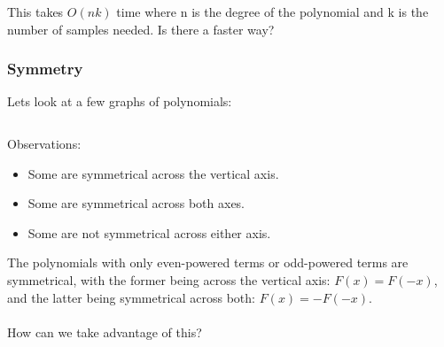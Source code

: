 \documentclass{beamer}
\begin{document}
\begin{frame}
  This takes $O(nk)$ time where n is the degree of the polynomial and k is the number of samples needed. Is there a faster way?
\end{frame}

\begin{frame}
  \frametitle{Symmetry}
  Lets look at a few graphs of polynomials:

  \begin{columns}
  \end{columns}
\end{frame}

\begin{frame}
  \begin{columns}
  \end{columns}
\end{frame}

\begin{frame}
  \begin{columns}
  \end{columns}
\end{frame}

\begin{frame}
  Observations:
  \begin{itemize}
    \item Some are symmetrical across the vertical axis.
    \item Some are symmetrical across both axes.
    \item Some are not symmetrical across either axis.
  \end{itemize}

  The polynomials with only even-powered terms or odd-powered terms are symmetrical, with the former being across the vertical axis: $F(x) = F(-x)$, and the latter being symmetrical across both: $F(x) = -F(-x)$.\\~\\

  How can we take advantage of this?

\end{frame}
\end{document}
